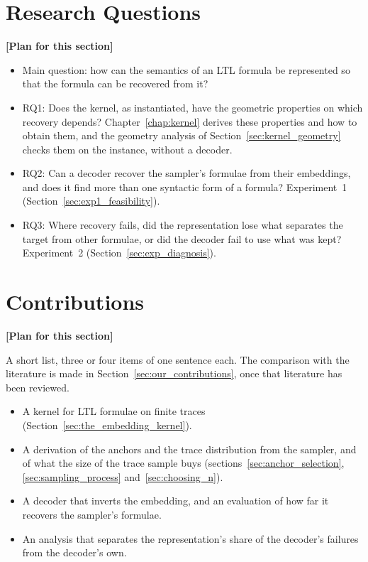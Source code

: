 \documentclass[titlepage,a4paper,11pt]{report}
\newenvironment{RSplan}{\par\medskip\color{orange!85!black}\noindent\textbf{[Plan for this section]}\par}{\par\medskip}
\begin{document}
    \section{Research Questions}\label{sec:intro_rqs}
    \begin{RSplan}
    \begin{itemize}
        \item Main question: how can the semantics of an LTL formula be represented so that the formula can be recovered from it?
        \item RQ1: Does the kernel, as instantiated, have the geometric properties on which recovery depends? Chapter~\ref{chap:kernel} derives these properties and how to obtain them, and the geometry analysis of Section~\ref{sec:kernel_geometry} checks them on the instance, without a decoder.
        \item RQ2: Can a decoder recover the sampler's formulae from their embeddings, and does it find more than one syntactic form of a formula? Experiment~1 (Section~\ref{sec:exp1_feasibility}).
        \item RQ3: Where recovery fails, did the representation lose what separates the target from other formulae, or did the decoder fail to use what was kept? Experiment~2 (Section~\ref{sec:exp_diagnosis}).
    \end{itemize}
    \end{RSplan}

    \section{Contributions}\label{sec:intro_contributions}
    \begin{RSplan}
    A short list, three or four items of one sentence each. The comparison with the literature is made in Section~\ref{sec:our_contributions}, once that literature has been reviewed.
    \begin{itemize}
        \item A kernel for LTL formulae on finite traces (Section~\ref{sec:the_embedding_kernel}).
        \item A derivation of the anchors and the trace distribution from the sampler, and of what the size of the trace sample buys  (sections~\ref{sec:anchor_selection}, \ref{sec:sampling_process} and~\ref{sec:choosing_n}).
        \item A decoder that inverts the embedding, and an evaluation of how far it recovers the sampler's formulae.
        \item An analysis that separates the representation's share of the decoder's failures from the decoder's own.
    \end{itemize}
    \end{RSplan}
\end{document}
